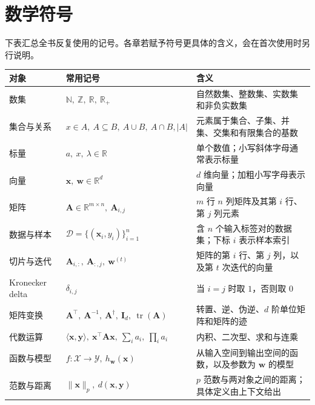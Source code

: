 \chapter*{数学符号}

\begin{fullwidth}
  下表汇总全书反复使用的记号。各章若赋予符号更具体的含义，会在首次使用时另行说明。

  \begingroup
  \small
  \setlength{\tabcolsep}{5pt}
  \renewcommand{\arraystretch}{1.14}
  \vspace{5mm}
  \smallskip
  \noindent\begin{tabularx}{\linewidth}{@{}p{31mm}p{56mm}>{\raggedright\arraybackslash}X@{}}
    \toprule
    对象 & 常用记号 & 含义 \\
    \midrule
    数集
      & $\mathbb{N},\ \mathbb{Z},\ \mathbb{R},\ \mathbb{R}_{+}$
      & 自然数集、整数集、实数集和非负实数集 \\
    集合与关系
      & $x\in A,\ A\subseteq B,\ A\cup B,\ A\cap B,\lvert A\rvert$
      & 元素属于集合、子集、并集、交集和有限集合的基数 \\
    标量
      & $a,\ x,\ \lambda\in\mathbb{R}$
      & 单个数值；小写斜体字母通常表示标量 \\
    向量
      & $\bm{x},\ \bm{w}\in\mathbb{R}^{d}$
      & $d$ 维向量；加粗小写字母表示向量 \\
    矩阵
      & $\bm{A}\in\mathbb{R}^{m\times n},\ \bm{A}_{i,j}$
      & $m$ 行 $n$ 列矩阵及其第 $i$ 行、第 $j$ 列元素 \\
    数据与样本
      & $\mathcal{D}=\{(\bm{x}_i,y_i)\}_{i=1}^{n}$
      & 含 $n$ 个输入标签对的数据集；下标 $i$ 表示样本索引 \\
    切片与迭代
      & $\bm{A}_{i,:},\ \bm{A}_{:,j},\ \bm{w}^{(t)}$
      & 矩阵的第 $i$ 行、第 $j$ 列，以及第 $t$ 次迭代的向量 \\
    Kronecker delta
      & $\delta_{i,j}$
      & 当 $i=j$ 时取 $1$，否则取 $0$ \\
    矩阵变换
      & $\bm{A}^{\top},\ \bm{A}^{-1},\ \bm{A}^{\dagger},\
        \bm{I}_{d},\ \operatorname{tr}(\bm{A})$
      & 转置、逆、伪逆、$d$ 阶单位矩阵和矩阵的迹 \\
    代数运算
      & $\langle\bm{x},\bm{y}\rangle,\ \bm{x}^{\top}\bm{A}\bm{x},\
        \sum_i a_i,\ \prod_i a_i$
      & 内积、二次型、求和与连乘 \\
    函数与模型
      & $f\colon\mathcal{X}\to\mathcal{Y},\ h_{\bm{w}}(\bm{x})$
      & 从输入空间到输出空间的函数，以及参数为 $\bm{w}$ 的模型 \\
    范数与距离
      & $\lVert\bm{x}\rVert_p,\ d(\bm{x},\bm{y})$
      & $p$ 范数与两对象之间的距离；具体定义由上下文给出 \\
    \bottomrule
  \end{tabularx}


\end{fullwidth}
